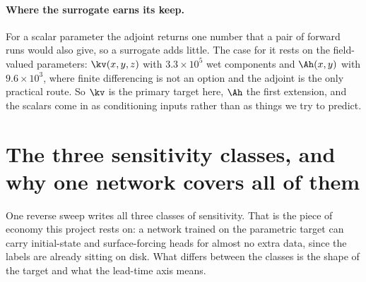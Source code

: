 \paragraph{Where the surrogate earns its keep.}
For a scalar parameter the adjoint returns one number that a pair of forward
runs would also give, so a surrogate adds little. The case for it rests on the
field-valued parameters: $\kv(x,y,z)$ with $3.3\times10^{5}$ wet components and
$\Ah(x,y)$ with $9.6\times10^{3}$, where finite differencing is not an option
and the adjoint is the only practical route. So $\kv$ is the primary target
here, $\Ah$ the first extension, and the scalars come in as conditioning inputs
rather than as things we try to predict.

\section{The three sensitivity classes, and why one network covers all of them}
\label{sec:classes}

One reverse sweep writes all three classes of sensitivity. That is the piece of
economy this project rests on: a network trained on the parametric target can
carry initial-state and surface-forcing heads for almost no extra data, since
the labels are already sitting on disk. What differs between the classes is the
shape of the target and what the lead-time axis means.

